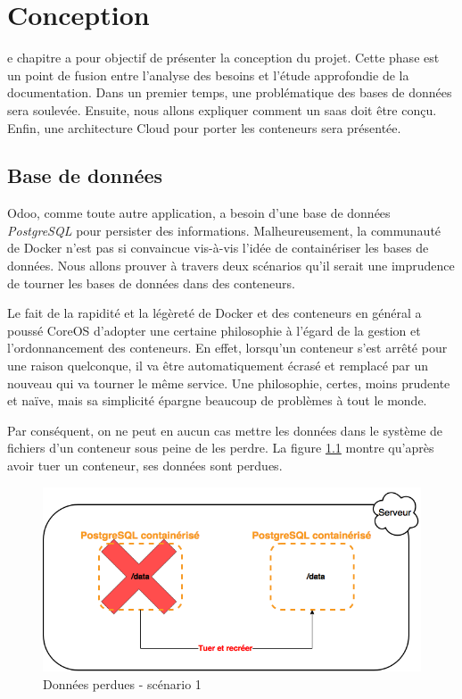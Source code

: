 \chapter{Conception}
\begin{onehalfspace}

e chapitre a pour objectif de présenter la conception du projet. Cette phase est un point de fusion entre l'analyse des besoins et l'étude approfondie de la documentation. Dans un premier temps, une problématique des bases de données sera soulevée. Ensuite, nous allons expliquer comment un \acrshort{saas} doit être conçu. Enfin, une architecture Cloud pour porter les conteneurs sera présentée.

\newpage

\section{Base de données}



Odoo, comme toute autre application, a besoin d'une base de données \emph{PostgreSQL} pour persister des informations. Malheureusement, la communauté de Docker n'est pas si convaincue vis-à-vis l'idée de containériser les bases de données. Nous allons prouver à travers deux scénarios qu'il serait une imprudence de tourner les bases de données dans des conteneurs.

Le fait de la rapidité et la légèreté de Docker et des conteneurs en général a poussé CoreOS d'adopter une certaine philosophie à l'égard de la gestion et l'ordonnancement des conteneurs. En effet, lorsqu'un conteneur s'est arrêté pour une raison quelconque, il va être automatiquement écrasé et remplacé par un nouveau qui va tourner le même service. Une philosophie, certes, moins prudente et naïve, mais sa simplicité épargne beaucoup de problèmes à tout le monde.

Par conséquent, on ne peut en aucun cas mettre les données dans le système de fichiers d'un conteneur sous peine de les perdre. La figure \ref{fig:database1} montre qu'après avoir tuer un conteneur, ses données sont perdues.

\begin{figure}[H]
\centering
\includegraphics [scale=0.5]{chapitre4/assets/database1}
\caption{Données perdues - scénario 1}
\label{fig:database1}
\end{figure}


\end{onehalfspace}
